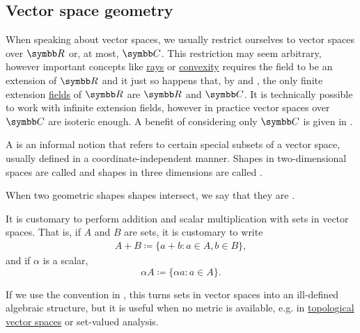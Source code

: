 \subsection{Vector space geometry}\label{subsec:vector_space_geometry}

\begin{remark}\label{remark:real_field_extensions}
  When speaking about vector spaces, we usually restrict ourselves to vector spaces over \( \BR \) or, at most, \( \BC \). This restriction may seem arbitrary, however important concepts like \hyperref[def:geometric_ray]{rays} or \hyperref[def:convex_set]{convexity} requires the field to be an extension of \( \BR \) and it just so happens that, by  and , the only finite extension \hyperref[def:field_extension]{fields} of \( \BR \) are \( \BR \) and \( \BC \). It is technically possible to work with infinite extension fields, however in practice vector spaces over \( \BC \) are isoteric enough. A benefit of considering only \( \BC \) is given in .
\end{remark}

\begin{definition}\label{def:geometric_shape}
  A  is an informal notion that refers to certain special subsets of a vector space, usually defined in a coordinate-independent manner. Shapes in two-dimensional spaces are called  and shapes in three dimensions are called .

  When two geometric shapes shapes intersect, we say that they are .
\end{definition}

\begin{remark}\label{remark:vector_space_set_operations}
  It is customary to perform addition and scalar multiplication with sets in vector spaces. That is, if \( A \) and \( B \) are sets, it is customary to write
  \begin{align*}
    A + B \coloneqq \{ a + b \colon a \in A, b \in B \},
  \end{align*}
  and if \( \alpha \) is a scalar,
  \begin{equation*}
    \alpha A \coloneqq \{ \alpha a \colon a \in A \}.
  \end{equation*}

  If we use the convention in , this turns sets in vector spaces into an ill-defined algebraic structure, but it is useful when no metric is available, e.g. in \hyperref[def:topological_vector_space]{topological vector spaces} or set-valued analysis.
\end{remark}

